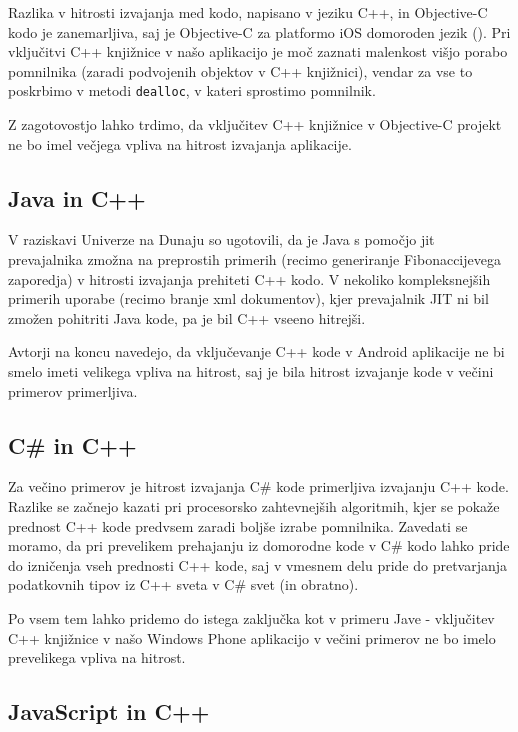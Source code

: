 Razlika v hitrosti izvajanja med kodo, napisano v jeziku C++, in Objective-C kodo je zanemarljiva, saj je Objective-C za platformo iOS domoroden jezik (). Pri vključitvi C++ knjižnice v našo aplikacijo je moč zaznati malenkost višjo porabo pomnilnika (zaradi podvojenih objektov v C++ knjižnici), vendar za vse to poskrbimo v metodi \texttt{dealloc}, v kateri sprostimo pomnilnik.

Z zagotovostjo lahko trdimo, da vključitev C++ knjižnice v Objective-C projekt ne bo imel večjega vpliva na hitrost izvajanja aplikacije.

\subsection{Java in C++}

V raziskavi Univerze na Dunaju\cite{android-cpp} so ugotovili, da je Java s pomočjo \gls{jit} prevajalnika zmožna na preprostih primerih (recimo generiranje Fibonaccijevega zaporedja) v hitrosti izvajanja prehiteti C++ kodo. V nekoliko kompleksnejših primerih uporabe (recimo branje \gls{xml} dokumentov), kjer prevajalnik JIT ni bil zmožen pohitriti Java kode, pa je bil C++ vseeno hitrejši.

Avtorji na koncu navedejo, da vključevanje C++ kode v Android aplikacije ne bi smelo imeti velikega vpliva na hitrost, saj je bila hitrost izvajanje kode v večini primerov primerljiva.

\subsection{C\# in C++}

Za večino primerov je hitrost izvajanja C\# kode primerljiva izvajanju C++ kode. Razlike se začnejo kazati pri procesorsko zahtevnejših algoritmih, kjer se pokaže prednost C++ kode predvsem zaradi boljše izrabe pomnilnika\cite{windows-phone-dev}. Zavedati se moramo, da pri prevelikem prehajanju iz domorodne kode v C\# kodo lahko pride do izničenja vseh prednosti C++ kode, saj v vmesnem delu pride do pretvarjanja podatkovnih tipov iz C++ sveta v C\# svet (in obratno).

Po vsem tem lahko pridemo do istega zaključka kot v primeru Jave - vključitev C++ knjižnice v našo Windows Phone aplikacijo v večini primerov ne bo imelo prevelikega vpliva na hitrost.

\subsection{JavaScript in C++}

